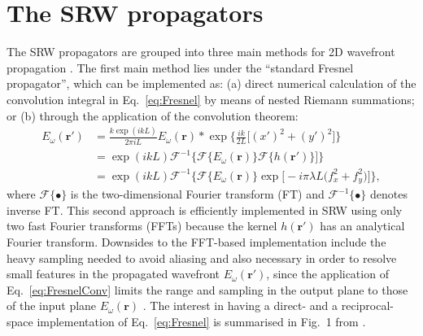 \documentclass{iucr}              %
\begin{document}


\appendix

\section{The SRW propagators}
\label{sec:appendixSRWpropagators}

 The SRW propagators are grouped into three main methods for 2D wavefront propagation \cite{SRWgit}. The first main method lies under the ``standard Fresnel propagator'', which can be implemented as: (a) direct numerical calculation of the convolution integral in Eq.~\ref{eq:Fresnel} by means of nested Riemann summations; or (b) through the application of the convolution theorem:
 \begin{equation}\label{eq:FresnelConv}
\begin{split}
    E_\omega(\textbf{r}')&=\frac{k\exp{(ikL)}}{2\pi i L} E_\omega(\textbf{r}) * \exp{\bigg\{ \frac{ik}{2L}\big[ (x')^2 + (y')^2 \big]\bigg\}}\\
   &= \exp{(ikL)}\mathcal{F}^{-1}\big\{\mathcal{F}\{E_\omega(\textbf{r})\}\mathcal{F}\{h(\textbf{r}')\}\big]\}\\
   &=\exp{(ikL)}\mathcal{F}^{-1}\big\{\mathcal{F}\{E_\omega(\textbf{r})\}\exp\big[-i\pi\lambda L\big(f_x^2+f_y^2\big)\big]\},
\end{split}
\end{equation}
where $\mathcal{F}\{\bullet\}$ is the two-dimensional Fourier transform (FT) and $\mathcal{F}^{-1}\{\bullet\}$ denotes inverse FT. This second approach is efficiently implemented in SRW using only two fast Fourier transforms (FFTs) because the kernel $h(\textbf{r}')$ has an analytical Fourier transform. Downsides to the FFT-based implementation include the heavy sampling needed to avoid aliasing and also necessary in order to resolve small features in the propagated wavefront $ E_\omega(\textbf{r}')$, since the application of Eq.~\ref{eq:FresnelConv} limits the range and sampling in the output plane to those of the input plane $ E_\omega(\textbf{r})$ \cite{Kelly2014}. The interest in having a direct- and a reciprocal-space implementation of Eq.~\ref{eq:Fresnel} is summarised in Fig.~1 from \cite{Li2015}.
\end{document}
